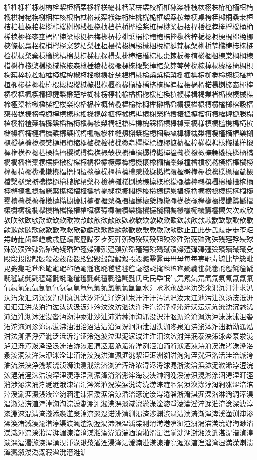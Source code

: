 栌栍栎栏栐树栒栓栔栕栖栗栘栙栚栛栜栝栞栟栠校栢栣栤栥栦栧栨栩株栫栬栭栮栯栰栱栲栳栴栵栶样核根栺栻格栽栾栿桀桁桂桃桄桅框桇案桉桊桋桌桍桎桏桐桑桒桓桔桕桖桗桘桙桚桛桜桝桞桟桠桡桢档桤桥桦桧桨桩桪桫桬桭桮桯桰桱桲桳桴桵桶桷桸桹桺桻桼桽桾桿梀梁梂梃梄梅梆梇梈梉梊梋梌梍梎梏梐梑梒梓梔梕梖梗梘梙梚梛梜條梞梟梠梡梢梣梤梥梦梧梨梩梪梫梬梭梮梯械梱梲梳梴梵梶梷梸梹梺梻梼梽梾梿检棁棂棃棄棅棆棇棈棉棊棋棌棍棎棏棐棑棒棓棔棕棖棗棘棙棚棛棜棝棞棟棠棡棢棣棤棥棦棧棨棩棪棫棬棭森棯棰棱棲棳棴棵棶棷棸棹棺棻棼棽棾棿椀椁椂椃椄椅椆椇椈椉椊椋椌植椎椏椐椑椒椓椔椕椖椗椘椙椚椛検椝椞椟椠椡椢椣椤椥椦椧椨椩椪椫椬椭椮椯椰椱椲椳椴椵椶椷椸椹椺椻椼椽椾椿楀楁楂楃楄楅楆楇楈楉楊楋楌楍楎楏楐楑楒楓楔楕楖楗楘楙楚楛楜楝楞楟楠楡楢楣楤楥楦楧楨楩楪楫楬業楮楯楰楱楲楳楴極楶楷楸楹楺楻楼楽楾楿榀榁概榃榄榅榆榇榈榉榊榋榌榍榎榏榐榑榒榓榔榕榖榗榘榙榚榛榜榝榞榟榠榡榢榣榤榥榦榧榨榩榪榫榬榭榮榯榰榱榲榳榴榵榶榷榸榹榺榻榼榽榾榿槀槁槂槃槄槅槆槇槈槉槊構槌槍槎槏槐槑槒槓槔槕槖槗様槙槚槛槜槝槞槟槠槡槢槣槤槥槦槧槨槩槪槫槬槭槮槯槰槱槲槳槴槵槶槷槸槹槺槻槼槽槾槿樀樁樂樃樄樅樆樇樈樉樊樋樌樍樎樏樐樑樒樓樔樕樖樗樘標樚樛樜樝樞樟樠模樢樣樤樥樦樧樨権横樫樬樭樮樯樰樱樲樳樴樵樶樷樸樹樺樻樼樽樾樿橀橁橂橃橄橅橆橇橈橉橊橋橌橍橎橏橐橑橒橓橔橕橖橗橘橙橚橛橜橝橞機橠橡橢橣橤橥橦橧橨橩橪橫橬橭橮橯橰橱橲橳橴橵橶橷橸橹橺橻橼橽橾橿檀檁檂檃檄檅檆檇檈檉檊檋檌檍檎檏檐檑檒檓檔檕檖檗檘檙檚檛檜檝檞檟檠檡檢檣檤檥檦檧檨檩檪檫檬檭檮檯檰檱檲檳檴檵檶檷檸檹檺檻檼檽檾檿櫀櫁櫂櫃櫄櫅櫆櫇櫈櫉櫊櫋櫌櫍櫎櫏櫐櫑櫒櫓櫔櫕櫖櫗櫘櫙櫚櫛櫜櫝櫞櫟櫠櫡櫢櫣櫤櫥櫦櫧櫨櫩櫪櫫櫬櫭櫮櫯櫰櫱櫲櫳櫴櫵櫶櫷櫸櫹櫺櫻櫼櫽櫾櫿欀欁欂欃欄欅欆欇欈欉權欋欌欍欎欏欐欑欒欓欔欕欖欗欘欙欚欛欜欝欞欟欠次欢欣欤欥欦欧欨欩欪欫欬欭欮欯欰欱欲欳欴欵欶欷欸欹欺欻欼欽款欿歀歁歂歃歄歅歆歇歈歉歊歋歌歍歎歏歐歑歒歓歔歕歖歗歘歙歚歛歜歝歞歟歠歡止正此步武歧歨歩歪歫歬歭歮歯歰歱歲歳歴歵歶歷歸歹歺死歼歽歾歿殀殁殂殃殄殅殆殇殈殉殊残殌殍殎殏殐殑殒殓殔殕殖殗殘殙殚殛殜殝殞殟殠殡殢殣殤殥殦殧殨殩殪殫殬殭殮殯殰殱殲殳殴段殶殷殸殹殺殻殼殽殾殿毀毁毂毃毄毅毆毇毈毉毊毋毌母毎每毐毑毒毓比毕毖毗毘毙毚毛毜毝毞毟毠毡毢毣毤毥毦毧毨毩毪毫毬毭毮毯毰毱毲毳毴毵毶毷毸毹毺毻毼毽毾毿氀氁氂氃氄氅氆氇氈氉氊氋氌氍氎氏氐民氒氓气氕氖気氘氙氚氛氜氝氞氟氠氡氢氣氤氥氦氧氨氩氪氫氬氭氮氯氰氱氲氳水氵氶氷永氹氺氻氼氽氾氿汀汁求汃汄汅汆汇汈汉汊汋汌汍汎汏汐汑汒汓汔汕汖汗汘汙汚汛汜汝汞江池污汢汣汤汥汦汧汨汩汪汫汬汭汮汯汰汱汲汳汴汵汶汷汸汹決汻汼汽汾汿沀沁沂沃沄沅沆沇沈沉沊沋沌沍沎沏沐沑沒沓沔沕沖沗沘沙沚沛沜沝沞沟沠没沢沣沤沥沦沧沨沩沪沫沬沭沮沯沰沱沲河沴沵沶沷沸油沺治沼沽沾沿泀況泂泃泄泅泆泇泈泉泊泋泌泍泎泏泐泑泒泓泔法泖泗泘泙泚泛泜泝泞泟泠泡波泣泤泥泦泧注泩泪泫泬泭泮泯泰泱泲泳泴泵泶泷泸泹泺泻泼泽泾泿洀洁洂洃洄洅洆洇洈洉洊洋洌洍洎洏洐洑洒洓洔洕洖洗洘洙洚洛洜洝洞洟洠洡洢洣洤津洦洧洨洩洪洫洬洭洮洯洰洱洲洳洴洵洶洷洸洹洺活洼洽派洿浀流浂浃浄浅浆浇浈浉浊测浌浍济浏浐浑浒浓浔浕浖浗浘浙浚浛浜浝浞浟浠浡浢浣浤浥浦浧浨浩浪浫浬浭浮浯浰浱浲浳浴浵浶海浸浹浺浻浼浽浾浿涀涁涂涃涄涅涆涇消涉涊涋涌涍涎涏涐涑涒涓涔涕涖涗涘涙涚涛涜涝涞涟涠涡涢涣涤涥润涧涨涩涪涫涬涭涮涯涰涱液涳涴涵涶涷涸涹涺涻涼涽涾涿淀淁淂淃淄淅淆淇淈淉淊淋淌淍淎淏淐淑淒淓淔淕淖淗淘淙淚淛淜淝淞淟淠淡淢淣淤淥淦淧淨淩淪淫淬淭淮淯淰深淲淳淴淵淶混淸淹淺添淼淽淾淿渀渁渂渃渄清渆渇済渉渊渋渌渍渎渏渐渑渒渓渔渕渖渗渘渙渚減渜渝渞渟渠渡渢渣渤渥渦渧渨温渪渫測渭渮港渰渱渲渳渴渵渶渷游渹渺渻渼渽渾渿湀湁湂湃湄湅湆湇湈湉湊湋湌湍湎湏湐湑湒湓湔湕湖湗湘湙湚湛湜湝湞湟湠湡湢湣湤湥湦湧湨湩湪湫湬湭湮湯湰湱湲湳湴湵湶湷湸湹湺湻湼湽湾湿満溁溂溃溄溅溆溇溈溉溊溋溌溍溎溏
